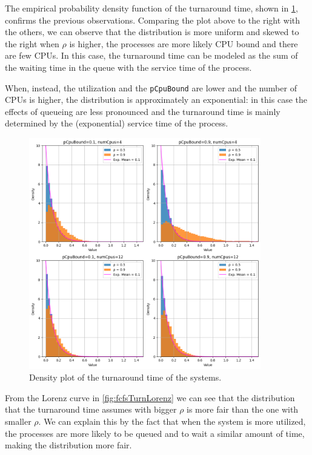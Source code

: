 The empirical probability density function of the turnaround time, shown
in \cref{fig:fcfsTurnDensity}, confirms the previous observations. Comparing
the plot above to the right with the others, we can observe that
the distribution is more uniform and skewed to the right when $\rho$ is higher,
the processes are more likely CPU bound and there are few CPUs. In this case, 
the turnaround time can be modeled as the sum of the waiting time in the queue with the 
service time of the process. 

When, instead, the utilization and the \texttt{pCpuBound} are lower and the 
number of CPUs is higher, the distribution is approximately an exponential:
in this case the effects of queueing are less pronounced and the turnaround time
is mainly determined by the (exponential) service time of the process.

\begin{figure}[H]
    \captionsetup{type=figure}
    \centering
    \includegraphics[width=0.9\textwidth]{./images/04/fcfs/turn/density.png}
    \caption{Density plot of the turnaround time of the systems.}
    \label{fig:fcfsTurnDensity}
\end{figure}

From the Lorenz curve in \cref{fig:fcfsTurnLorenz} we can see that the 
distribution that the turnaround time assumes with bigger $\rho$ is more fair 
than the one with smaller $\rho$. We can explain this by the fact that when the
system is more utilized, the processes are more likely to be queued and to wait
a similar amount of time, making the distribution more fair.

